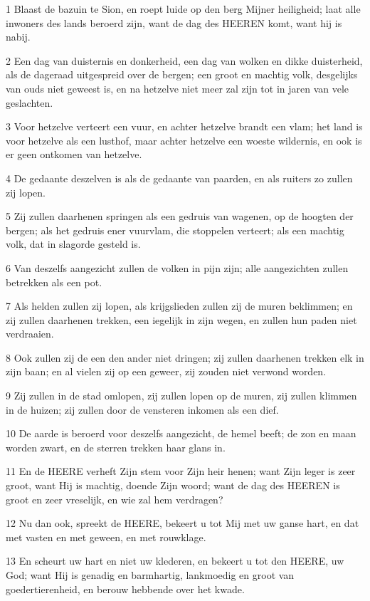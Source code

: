 \par 1 Blaast de bazuin te Sion, en roept luide op den berg Mijner heiligheid; laat alle inwoners des lands beroerd zijn, want de dag des HEEREN komt, want hij is nabij.
\par 2 Een dag van duisternis en donkerheid, een dag van wolken en dikke duisterheid, als de dageraad uitgespreid over de bergen; een groot en machtig volk, desgelijks van ouds niet geweest is, en na hetzelve niet meer zal zijn tot in jaren van vele geslachten.
\par 3 Voor hetzelve verteert een vuur, en achter hetzelve brandt een vlam; het land is voor hetzelve als een lusthof, maar achter hetzelve een woeste wildernis, en ook is er geen ontkomen van hetzelve.
\par 4 De gedaante deszelven is als de gedaante van paarden, en als ruiters zo zullen zij lopen.
\par 5 Zij zullen daarhenen springen als een gedruis van wagenen, op de hoogten der bergen; als het gedruis ener vuurvlam, die stoppelen verteert; als een machtig volk, dat in slagorde gesteld is.
\par 6 Van deszelfs aangezicht zullen de volken in pijn zijn; alle aangezichten zullen betrekken als een pot.
\par 7 Als helden zullen zij lopen, als krijgslieden zullen zij de muren beklimmen; en zij zullen daarhenen trekken, een iegelijk in zijn wegen, en zullen hun paden niet verdraaien.
\par 8 Ook zullen zij de een den ander niet dringen; zij zullen daarhenen trekken elk in zijn baan; en al vielen zij op een geweer, zij zouden niet verwond worden.
\par 9 Zij zullen in de stad omlopen, zij zullen lopen op de muren, zij zullen klimmen in de huizen; zij zullen door de vensteren inkomen als een dief.
\par 10 De aarde is beroerd voor deszelfs aangezicht, de hemel beeft; de zon en maan worden zwart, en de sterren trekken haar glans in.
\par 11 En de HEERE verheft Zijn stem voor Zijn heir henen; want Zijn leger is zeer groot, want Hij is machtig, doende Zijn woord; want de dag des HEEREN is groot en zeer vreselijk, en wie zal hem verdragen?
\par 12 Nu dan ook, spreekt de HEERE, bekeert u tot Mij met uw ganse hart, en dat met vasten en met geween, en met rouwklage.
\par 13 En scheurt uw hart en niet uw klederen, en bekeert u tot den HEERE, uw God; want Hij is genadig en barmhartig, lankmoedig en groot van goedertierenheid, en berouw hebbende over het kwade.
